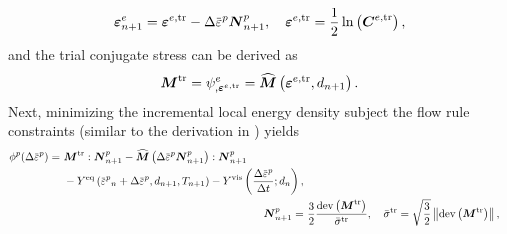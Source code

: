 \begin{align}
  \strain^e_{n+1} = \strain^{e,\text{tr}} - \Delta\ep\bfN^p_{n+1}, \quad \strain^{e,\text{tr}} = \dfrac{1}{2}\ln\left( \bfC^{e,\text{tr}} \right),
\end{align}
and the trial conjugate stress can be derived as
\begin{align}
  \boldsymbol{M}^\text{tr} = \psi^e_{,\boldsymbol{\varepsilon}^{e,\text{tr}}} = \widehat{\boldsymbol{M}}\left( \boldsymbol{\varepsilon}^{e,\text{tr}}, d_{n+1} \right).
\end{align}
Next, minimizing the incremental local energy density subject the flow rule constraints (similar to the derivation in ) yields
\begin{subequations}
  \begin{align}
    \begin{split}
      \phi^p(\Delta\ep) = &\ \bfM^\text{tr}:\bfN^p_{n+1} - \widehat{\bfM}\left( \Delta\ep \bfN^p_{n+1} \right):\bfN^p_{n+1} \\
      &\ - Y^\text{eq}\left( \ep_n + \Delta\ep, d_{n+1}, T_{n+1} \right) - Y^\text{vis}\left( \dfrac{\Delta \ep}{\Delta t}; d_{n} \right) ,
    \end{split}                                                                                                                                                                      \\
    \bfN^p_{n+1} = & \  \dfrac{3}{2} \dfrac{\dev\left( \bfM^\text{tr} \right)}{\bar{\sigma}^\text{tr}}, \quad \bar{\sigma}^\text{tr} = \sqrt{\dfrac{3}{2}}\norm{\dev\left( \bfM^\text{tr} \right)},
  \end{align}
\end{subequations}
